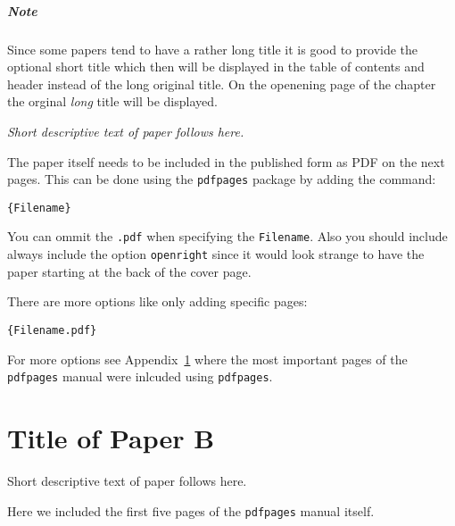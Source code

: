 \documentclass[%
norsk,  %
]{USN-BSc}
\begin{document}
\paragraph{Note}
Since some papers tend to have a rather long title it is good to provide the optional short title which then will be displayed in the table of contents and header instead of the long original title.
On the openening page of the chapter the orginal \emph{long} title will be displayed.\bigskip

\emph{Short descriptive text of paper follows here.}\bigskip

The paper itself needs to be included in the published form as PDF on the next pages.
This can be done using the \texttt{pdfpages} package by adding the command:

\begin{verbatim}
{Filename}
\end{verbatim}

You can ommit the \texttt{.pdf} when specifying the \texttt{Filename}. Also you should include always include the option \texttt{openright} since it would look strange to have the paper starting at the back of the cover page.

There are more options like only adding specific pages:
\begin{verbatim}
{Filename.pdf}
\end{verbatim}

For more options see Appendix~\ref{paper-b} where the most important pages of the \texttt{pdfpages} manual were inlcuded using \texttt{pdfpages}.




\chapter[Short Title of Paper B]{Title of Paper B}
\label{paper-b}
Short descriptive text of paper follows here.

Here we included the first five pages of the \texttt{pdfpages} manual itself.


\end{document}
